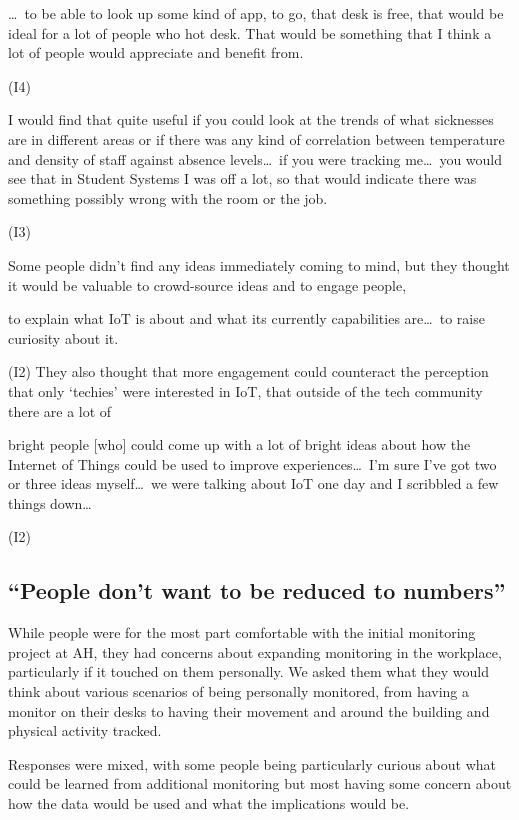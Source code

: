 \begin{qt}\ldots\  to be able to look up some kind of app, to go, that desk is free,
that would be ideal for a lot of people who hot desk. That would be
something that I think a lot of people would appreciate and benefit
from.\end{qt} (I4)

\begin{qt}I would find that quite useful if you could look at the trends of
what sicknesses are in different areas or if there was any kind of
correlation between temperature and density of staff against absence
levels\ldots\  if you were tracking me\ldots\ you would see that in Student Systems I was off a lot, so that
would indicate there was something possibly wrong with the room or the
job.\end{qt} (I3)

Some people didn’t find any ideas immediately coming to mind, but they
thought it would be valuable to crowd-source ideas and to engage people, \begin{qt}to explain what IoT is about and what its currently capabilities are\ldots\  to raise curiosity about it.\end{qt} (I2) They also thought that more engagement could counteract the perception that only ‘techies’ were interested in IoT, that outside of the tech community there are a lot of \begin{qt}bright people [who] could come up with a lot of bright ideas about how the
Internet of Things could be used to improve experiences\ldots\ I’m sure I’ve got two or three ideas myself\ldots\  we were talking about IoT one day and I scribbled a few
things down\ldots\end{qt} (I2)

\subsection{``People don’t want to be reduced to numbers”}
\label{sec:people-dont-want}

While people were for the most part comfortable with the initial
monitoring project at AH, they had concerns about expanding
monitoring in the workplace, particularly if it touched on them
personally. We asked them what they would think about various scenarios of being personally monitored, from having a monitor on their desks to having their movement and around the building and physical activity tracked.

Responses were mixed, with some people being particularly curious about what could be learned from additional monitoring but most having some concern about how the data would be used and what the implications would be.

